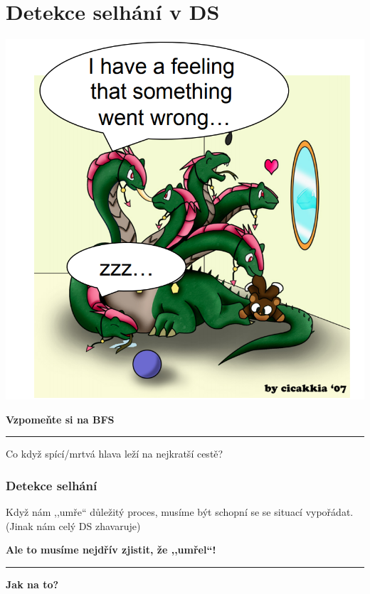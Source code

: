 \documentclass[usenames,dvipsnames,9pt]{beamer}
\begin{document}
\section{Detekce selhání v DS}

\begin{frame}
  \begin{minipage}{0.65\linewidth}
  \includegraphics[width=.95\linewidth]{10/figs/hydra.png}
  \end{minipage}
  \pause
  \begin{minipage}{0.33\linewidth}
    {\Large \bf Vzpomeňte si na BFS}

    \vspace{1.2em}\hrule\vspace{1.2em}

    Co když spící/mrtvá hlava leží na nejkratší cestě?
  \end{minipage}
\end{frame}

\begin{frame}
  \frametitle{Detekce selhání}

  {\LARGE Když nám ,,umře`` důležitý proces, musíme být schopní se se situací vypořádat.}
  \hfill (Jinak nám celý DS zhavaruje)

  \pause\vspace{2.5em}

  \hfill \Large \faWarning \hspace{5pt} \bf Ale to musíme nejdřív zjistit, že ,,umřel``!

  \pause\hspace{2.5em}\hrule\vspace{1.5em}
  \begin{center}
    \LARGE \bf Jak na to?
  \end{center}
\end{frame}
\end{document}
